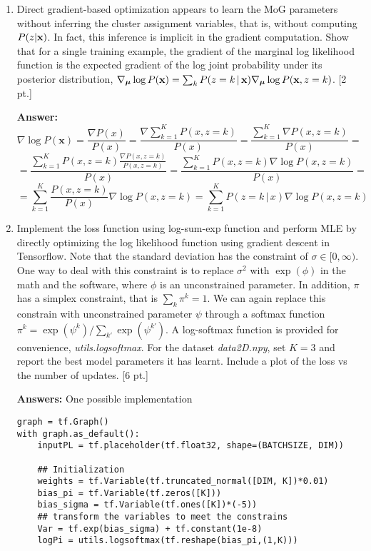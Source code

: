 \documentclass[12pt,letterpaper]{article}
\begin{document}
\begin{enumerate}
  \item Direct gradient-based optimization appears to learn the MoG parameters without inferring the cluster assignment variables, that is, without computing $P(z|\bold{x})$. In fact, this inference is implicit in the gradient computation. Show that for a single training example, the gradient of the marginal log likelihood function is the expected gradient of the log joint probability under its posterior distribution, $\nabla_{\boldsymbol{\mu}} \log P(\bold{x}) = \sum_k P(z=k\, | \, \bold{x}) \nabla_{\boldsymbol{\mu}} \log P(\bold{x}, z=k)$. [2 pt.] 

{\color{red} 
\textbf{Answer: }
    \[ \nabla \log P(\mathbf x) = \frac{\nabla P(x)}{P(x)} = \frac{\nabla \sum_{k=1}^{K}{P(x, z=k)}}{P(x)} = \frac{\sum_{k=1}^{K}{\nabla P(x, z=k)}}{P(x)} = \]
    \[= \frac{\sum_{k=1}^{K}{P(x,z=k)\frac{\nabla P(x, z=k)}{P(x,z=k)}}}{P(x)} = \frac{\sum_{k=1}^{K}{P(x,z=k)\nabla \log P(x, z=k)}}{P(x)} = \]
    \[= \sum_{k=1}^{K}{\frac{P(x,z=k)}{P(x)}\nabla \log P(x, z=k)} = \sum_{k=1}^{K}{P(z=k\, |\, x)\nabla \log P(x, z=k)}\]
}


\item Implement the loss function using log-sum-exp function and perform MLE by directly optimizing the log likelihood function using gradient descent in Tensorflow. Note that the standard deviation has the constraint of $\sigma \in [0, \infty)$. One way to deal with this constraint is to replace $\sigma^2$ with $\exp(\phi)$ in the math and the software, where $\phi$ is an unconstrained parameter. In addition, $\pi$ has a simplex constraint, that is $\sum_k \pi^k = 1$. We can again replace this constrain with unconstrained parameter $\psi$ through a softmax function $\pi^k = \exp(\psi^k)/\sum_{k'}\exp(\psi^{k'})$. A log-softmax function is provided for convenience, \textit{utils.logsoftmax}. For the dataset \textit{data2D.npy}, set $K=3$ and report the best model parameters it has learnt. Include a plot of the loss vs the number of updates. [6 pt.]

{\color{red}
  \textbf{Answers:}
  One possible implementation
}
\begin{verbatim}
graph = tf.Graph()
with graph.as_default():
    inputPL = tf.placeholder(tf.float32, shape=(BATCHSIZE, DIM))
    
    ## Initialization
    weights = tf.Variable(tf.truncated_normal([DIM, K])*0.01)
    bias_pi = tf.Variable(tf.zeros([K]))
    bias_sigma = tf.Variable(tf.ones([K])*(-5))
    ## transform the variables to meet the constrains
    Var = tf.exp(bias_sigma) + tf.constant(1e-8)
    logPi = utils.logsoftmax(tf.reshape(bias_pi,(1,K)))
    

\end{verbatim}
\end{enumerate}
\end{document}
